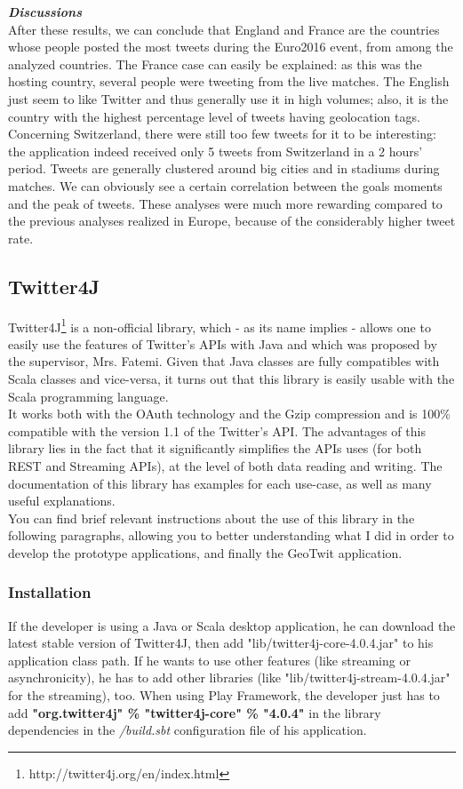 \documentclass[a4paper,11pt]{report}
\begin{document}
\textbf{\emph{Discussions}}\\
After these results, we can conclude that England and France are the countries whose people posted the most tweets during the Euro2016 event, from among the analyzed countries. The France case can easily be explained: as this was the hosting country, several people were tweeting from the live matches. The English just seem to like Twitter and thus generally use it in high volumes; also, it is the country with the highest percentage level of tweets having geolocation tags. Concerning Switzerland, there were still too few tweets for it to be interesting: the application indeed received only 5 tweets from Switzerland in a 2 hours' period.
Tweets are generally clustered around big cities and in stadiums during matches. We can obviously see a certain correlation between the goals moments and the peak of tweets. These analyses were much more rewarding compared to the previous analyses realized in Europe, because of the considerably higher tweet rate.
\newpage

\subsection{Twitter4J}
\label{twitter4j}
Twitter4J\footnote{http://twitter4j.org/en/index.html} is a non-official library, which - as its name implies - allows one to easily use the features of Twitter's APIs with Java and which was proposed by the supervisor, Mrs. Fatemi. Given that Java classes are fully compatibles with Scala classes and vice-versa, it turns out that this library is easily usable with the Scala programming language.\\

It works both with the OAuth technology and the Gzip compression and is 100\% compatible with the version 1.1 of the Twitter's API. The advantages of this library lies in the fact that it significantly simplifies the APIs uses (for both REST and Streaming APIs), at the level of both data reading and writing. The documentation of this library has examples for each use-case, as well as many useful explanations.\\

You can find brief relevant instructions about the use of this library in the following paragraphs, allowing you to better understanding what I did in order to develop the prototype applications, and finally the GeoTwit application.\\

\subsubsection{Installation}
If the developer is using a Java or Scala desktop application, he can download the latest stable version of Twitter4J, then add "lib/twitter4j-core-4.0.4.jar" to his application class path. If he wants to use other features (like streaming or asynchronicity), he has to add other libraries (like "lib/twitter4j-stream-4.0.4.jar" for the streaming), too.
When using Play Framework, the developer just has to add \textbf{"org.twitter4j" \% "twitter4j-core" \% "4.0.4"} in the library dependencies in the \emph{/build.sbt} configuration file of his application.
\end{document}
